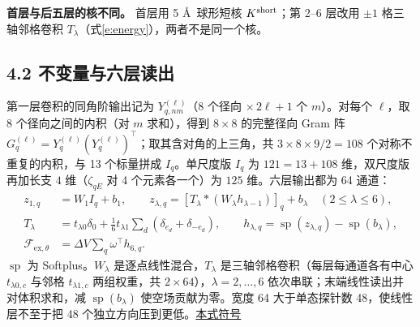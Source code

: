 \documentclass[UTF8,fontset=none,10pt,a4paper]{ctexart}
\newcommand{\ExT}{\mathcal F_{\mathrm{ex},\theta}}
\newcommand{\sd}[1]{\hfill\mbox{\footnotesize\hyperlink{sym:#1}{本式符号}}\par}
\begin{document}
\textbf{首层与后五层的核不同。} 首层用 5 \AA\ 球形短核 $K^{\rm short}$；第 2--6 层改用 $\pm1$ 格三轴邻格卷积 $T_\lambda$（式\eqref{e:energy}），两者不是同一个核。

\subsection*{4.2 不变量与六层读出}
第一层卷积的同角阶输出记为 $Y^{(\ell)}_{q,nm}$（$8$ 个径向 $\times\,2\ell+1$ 个 $m$）。对每个 $\ell$，取 $8$ 个径向之间的内积（对 $m$ 求和），得到 $8\times8$ 的完整径向 Gram 阵 $G_q^{(\ell)}=Y_q^{(\ell)}(Y_q^{(\ell)})^\top$；取其含对角的上三角，共 $3\times 8\times9/2=108$ 个对称不重复的内积，与 13 个标量拼成 $I_q$。单尺度版 $I_q$ 为 $121=13+108$ 维，双尺度版再加长支 $4$ 维（$\zeta_{qE}$ 对 4 个元素各一个）为 $125$ 维。六层输出都为 64 通道：
\begin{equation}\label{e:energy}
 \begin{aligned}
 z_{1,q}&=W_1 I_q+b_1, \qquad
 z_{\lambda,q}=[T_\lambda*(W_\lambda h_{\lambda-1})]_q+b_\lambda\quad (2\le\lambda\le 6),\\
 T_\lambda&=t_{\lambda0}\delta_0+
    \tfrac16 t_{\lambda1}\sum_{d}(\delta_{e_d}+\delta_{-e_d}),\qquad
 h_{\lambda,q}=\operatorname{sp}(z_{\lambda,q})-\operatorname{sp}(b_\lambda),\\
 \ExT&=\Delta V\sum_q \omega^\top h_{6,q}.
 \end{aligned}
\end{equation}
$\operatorname{sp}$ 为 Softplus。$W_\lambda$ 是逐点线性混合，$T_\lambda$ 是三轴邻格卷积（每层每通道各有中心 $t_{\lambda0,c}$ 与邻格 $t_{\lambda1,c}$ 两组权重，共 $2\times64$），$\lambda=2,\ldots,6$ 依次串联；末端线性读出并对体积求和，减 $\operatorname{sp}(b_\lambda)$ 使空场贡献为零。宽度 64 大于单态探针数 48，使线性层不至于把 48 个独立方向压到更低。\sd{e:energy}
\end{document}
